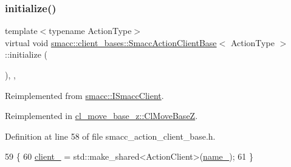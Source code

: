 \subsubsection{\texorpdfstring{initialize()}{initialize()}}
{\footnotesize\ttfamily template$<$typename Action\+Type$>$ \\
virtual void \hyperlink{classsmacc_1_1client__bases_1_1SmaccActionClientBase}{smacc\+::client\+\_\+bases\+::\+Smacc\+Action\+Client\+Base}$<$ Action\+Type $>$\+::initialize (\begin{DoxyParamCaption}{ }\end{DoxyParamCaption})\hspace{0.3cm}{\ttfamily [inline]}, {\ttfamily [override]}, {\ttfamily [virtual]}}



Reimplemented from \hyperlink{classsmacc_1_1ISmaccClient_a974ebb6ad6cf812e7b9de6b78b3d901f}{smacc\+::\+I\+Smacc\+Client}.



Reimplemented in \hyperlink{classcl__move__base__z_1_1ClMoveBaseZ_a7572804edd84a956967b9f8cf2d4081e}{cl\+\_\+move\+\_\+base\+\_\+z\+::\+Cl\+Move\+BaseZ}.



Definition at line 58 of file smacc\+\_\+action\+\_\+client\+\_\+base.\+h.


\begin{DoxyCode}
59     \{
60         \hyperlink{classsmacc_1_1client__bases_1_1SmaccActionClientBase_ac0c1dd56420ecb53cf0c90cd8bef1b4c}{client\_} = std::make\_shared<ActionClient>(\hyperlink{classsmacc_1_1client__bases_1_1SmaccActionClientBase_a7f2e1834e915bdf7ae9db8b90b4597e6}{name\_});
61     \}
\end{DoxyCode}
\mbox{\label{classsmacc_1_1client__bases_1_1SmaccActionClientBase_a75c58162621a705bfd11efdf068eb06b}} 
